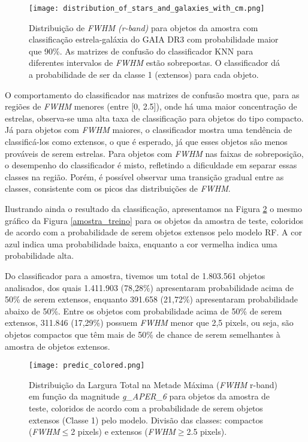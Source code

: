 \begin{figure}[!ht]
    \centering
    \texttt{[image: distribution\_of\_stars\_and\_galaxies\_with\_cm.png]}
    \caption[]{Distribuição de \textit{FWHM (r-band)} para objetos da amostra com classificação estrela-galáxia do GAIA DR3 com probabilidade maior que 90\%. As matrizes de confusão do classificador KNN para diferentes intervalos de \textit{FWHM} estão sobrepostas. O classificador dá a probabilidade de ser da classe 1 (extensos) para cada objeto. }
    \label{probabilidade_extensos_fwhm}
\end{figure}

O comportamento do classificador nas matrizes de confusão mostra que, para as regiões de \textit{FWHM} menores (entre [0, 2.5]), onde há uma maior concentração de estrelas, observa-se uma alta taxa de classificação para objetos do tipo compacto. Já para objetos com \textit{FWHM} maiores, o classificador mostra uma tendência de classificá-los como extensos, o que é esperado, já que esses objetos são menos prováveis de serem estrelas. Para objetos com \textit{FWHM} nas faixas de sobreposição, o desempenho do classificador é misto, refletindo a dificuldade em separar essas classes na região. Porém, é possível observar uma transição gradual entre as classes, consistente com os picos das distribuições de \textit{FWHM}.

Ilustrando ainda o resultado da classificação, apresentamos na Figura \ref{predic_colored} o mesmo gráfico da Figura \ref{amostra_treino} para os objetos da amostra de teste, coloridos de acordo com a probabilidade de serem objetos extensos pelo modelo RF. A cor azul indica uma probabilidade baixa, enquanto a cor vermelha indica uma probabilidade alta. 

Do classificador para a amostra, tivemos um total de 1.803.561 objetos analisados, dos quais 1.411.903 (78,28\%) apresentaram probabilidade acima de 50\% de serem extensos, enquanto 391.658 (21,72\%) apresentaram probabilidade abaixo de 50\%. Entre os objetos com probabilidade acima de 50\% de serem extensos, 311.846 (17,29\%) possuem \textit{FWHM} menor que 2,5 pixels, ou seja, são objetos compactos que têm mais de 50\% de chance de serem semelhantes à amostra de objetos extensos.

\begin{figure}[!ht]
    \centering
    \texttt{[image: predic\_colored.png]}
    \caption[]{Distribuição da Largura Total na Metade Máxima (\textit{FWHM} r-band) em função da magnitude \textit{g\_APER\_6} para objetos da amostra de teste, coloridos de acordo com a probabilidade de serem objetos extensos (Classe 1) pelo modelo. Divisão das classes: compactos (\textit{FWHM}$\leq$2 pixels) e extensos (\textit{FWHM}$\geq$2.5 pixels).}
    \label{predic_colored}
\end{figure}

